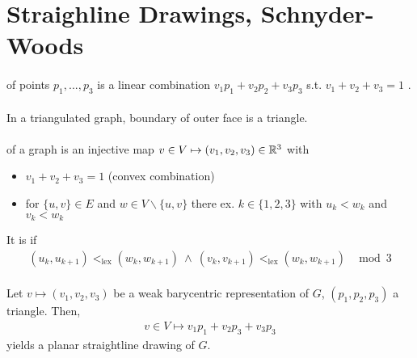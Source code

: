 \documentclass[10pt,twocolumn]{article}
\begin{document}
\section{Straighline Drawings, Schnyder-Woods}

\paragraph{} of points $p_1, ..., p_3$ is a linear
combination $v_1 p_1 + v_2 p_2 + v_3 p_3$ s.t. $v_1 + v_2 + v_3= 1$ .

\paragraph{} In a triangulated graph, boundary of outer face is a triangle.

\paragraph{} of a graph is an injective map $v
\in V \mapsto (v_1, v_2, v_3) \in \mathbb{R}^3$  with
\begin{itemize}
\item $v_1 + v_2 + v_3 = 1$ (convex combination)
\item for $\{u,v\} \in E$ and $w \in V \backslash \{u,v\}$ there ex. $k \in
  \{1,2,3\}$ with $u_k < w_k$ and $v_k < w_k$
\end{itemize}
It is  if
\begin{align*}
  (u_k, u_{k+1}) <_{\text{lex}} (w_k, w_{k+1}) ~\land~ (v_k, v_{k+1}) <_{\text{lex}} (w_k, w_{k+1}) ~~ \mod 3
\end{align*}


\paragraph{} Let $v \mapsto (v_1, v_2, v_3)$ be a weak barycentric
representation of $G$, $(p_1, p_2, p_3)$ a triangle. Then,
\begin{align*}
  v \in V \mapsto v_1 p_1 + v_2 p_3 + v_3 p_3
\end{align*}
yields a planar straightline drawing of $G$.
\end{document}
